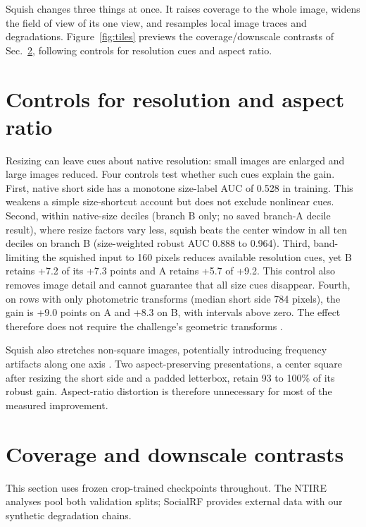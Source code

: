 \documentclass[letterpaper]{article} %
\begin{document}
Squish changes three things at once. It raises coverage to the whole
image, widens the field of view of its one view, and resamples local image
traces and degradations. Figure~\ref{fig:tiles} previews the coverage/downscale contrasts of
Sec.~\ref{sec:decomp}, following controls for resolution cues and aspect ratio.



\section{Controls for resolution and aspect ratio}
\label{sec:controls}

Resizing can leave cues about native resolution: small images are enlarged
and large images reduced. Four controls test whether such cues explain the
gain. First, native short side has a monotone size-label AUC of 0.528 in
training. This weakens a simple size-shortcut account but does not exclude
nonlinear cues. Second, within native-size deciles (branch B only; no saved branch-A decile result), where resize factors
vary less, squish beats the center window in all ten deciles on branch B
(size-weighted robust AUC 0.888 to 0.964). Third, band-limiting the squished
input to 160 pixels reduces available resolution cues, yet B retains +7.2
of its +7.3 points and A retains +5.7 of +9.2. This control also removes
image detail and cannot guarantee that all size cues disappear. Fourth,
on rows with only photometric transforms (median short side 784 pixels),
the gain is +9.0 points on A and +8.3 on B, with intervals above zero.
The effect therefore does not require the challenge's geometric
transforms \cite{gushchin2026ntire}.

Squish also stretches non-square images, potentially introducing frequency
artifacts along one axis \cite{grommelt2024fakeorjpeg}. Two
aspect-preserving presentations, a center square after resizing the short
side and a padded letterbox, retain 93 to 100\% of its robust gain.
Aspect-ratio distortion is therefore unnecessary for most of the measured
improvement.

\section{Coverage and downscale contrasts}
\label{sec:decomp}

This section uses frozen crop-trained checkpoints throughout. The NTIRE
analyses pool both validation splits; SocialRF provides external data with
our synthetic degradation chains.
\end{document}

